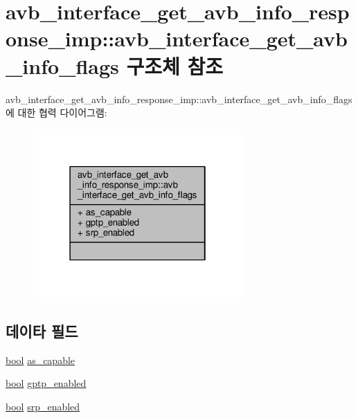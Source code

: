 \hypertarget{structavdecc__lib_1_1avb__interface__get__avb__info__response__imp_1_1avb__interface__get__avb__info__flags}{}\section{avb\+\_\+interface\+\_\+get\+\_\+avb\+\_\+info\+\_\+response\+\_\+imp\+:\+:avb\+\_\+interface\+\_\+get\+\_\+avb\+\_\+info\+\_\+flags 구조체 참조}
\label{structavdecc__lib_1_1avb__interface__get__avb__info__response__imp_1_1avb__interface__get__avb__info__flags}


avb\+\_\+interface\+\_\+get\+\_\+avb\+\_\+info\+\_\+response\+\_\+imp\+:\+:avb\+\_\+interface\+\_\+get\+\_\+avb\+\_\+info\+\_\+flags에 대한 협력 다이어그램\+:
\nopagebreak
\begin{figure}[H]
\begin{center}
\leavevmode
\includegraphics[width=226pt]{structavdecc__lib_1_1avb__interface__get__avb__info__response__imp_1_1avb__interface__get__avb__info__flags__coll__graph}
\end{center}
\end{figure}
\subsection*{데이타 필드}
\begin{DoxyCompactItemize}
\item 
\hyperlink{avb__gptp_8h_af6a258d8f3ee5206d682d799316314b1}{bool} \hyperlink{structavdecc__lib_1_1avb__interface__get__avb__info__response__imp_1_1avb__interface__get__avb__info__flags_a841ecf02ad6c925cf339a78c176e83cd}{as\+\_\+capable}
\item 
\hyperlink{avb__gptp_8h_af6a258d8f3ee5206d682d799316314b1}{bool} \hyperlink{structavdecc__lib_1_1avb__interface__get__avb__info__response__imp_1_1avb__interface__get__avb__info__flags_a01986b6f39f06dd3834c80df38992489}{gptp\+\_\+enabled}
\item 
\hyperlink{avb__gptp_8h_af6a258d8f3ee5206d682d799316314b1}{bool} \hyperlink{structavdecc__lib_1_1avb__interface__get__avb__info__response__imp_1_1avb__interface__get__avb__info__flags_af400e9eca233fc22a73a4b5624f6a5e8}{srp\+\_\+enabled}
\end{DoxyCompactItemize}


